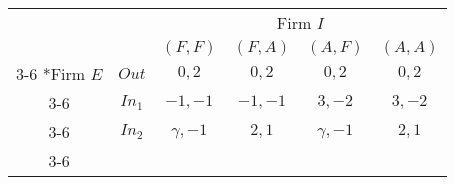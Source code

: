  \begin{table}[h]
	\centering
	\resizebox{9.5cm}{!} 
	{ 
		\renewcommand{\arraystretch}{1.7}
		\setlength{\extrarowheight}{1pt}
		\begin{tabular}{cc|c|c|c|c|}
			& \multicolumn{1}{c}{}  & \multicolumn{4}{c}{Firm $I$} \\
			& \multicolumn{1}{c}{} & \multicolumn{1}{c}{$(F,F)$} & \multicolumn{1}{c}{$(F,A)$} & \multicolumn{1}{c}{$(A,F)$} & \multicolumn{1}{c}{$(A,A)$}\\\cline{3-6}
			\multirow{3}*{Firm $E$}  & $Out$ & $0,2$ & $0,2$ &$0,2$&$0,2$ \\\cline{3-6}
			& $In_{1}$ & $-1,-1$ & $-1,-1$ &$3,-2$&$3,-2$ \\\cline{3-6}
			& $In_{2}$ &$\gamma, -1$&$2,1$&$\gamma, -1$&$2,1$\\\cline{3-6}
	\end{tabular}}
\end{table}
